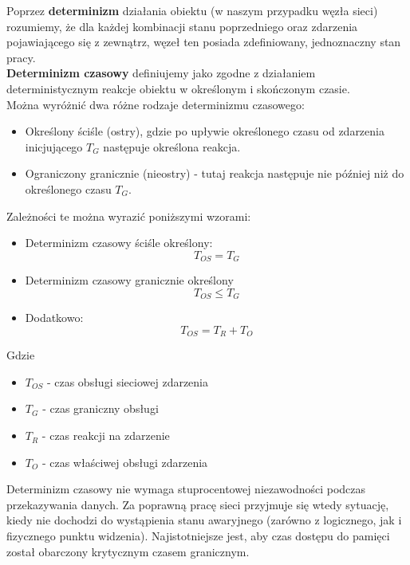 \documentclass[a4paper,twoside]{article}
\begin{document}
Poprzez \textbf{determinizm} działania obiektu (w naszym przypadku węzła sieci) rozumiemy, że dla każdej kombinacji stanu poprzedniego oraz zdarzenia pojawiającego się z zewnątrz, węzeł ten posiada zdefiniowany, jednoznaczny stan pracy. \\
\textbf{Determinizm czasowy} definiujemy jako zgodne z działaniem deterministycznym reakcje obiektu w określonym i skończonym czasie. \\
Można wyróżnić dwa różne rodzaje determinizmu czasowego:
\begin{itemize}
	\item Określony ściśle (ostry), gdzie po upływie określonego czasu od zdarzenia inicjującego $ T_G $ następuje określona reakcja.
	\item Ograniczony granicznie (nieostry) - tutaj reakcja następuje nie później niż do określonego czasu $ T_G $.
\end{itemize}
Zależności te można wyrazić poniższymi wzorami:
\begin{itemize}
	\item Determinizm czasowy ściśle określony:
	\begin{equation}
	T_{OS} = T_G
	\end{equation}
	\item Determinizm czasowy granicznie określony
	\begin{equation}
	T_{OS} \leq T_G
	\end{equation}
	\item Dodatkowo:
	\begin{equation}
	T_{OS} = T_R + T_O
	\end{equation}
\end{itemize}
Gdzie
\begin{itemize}
	\item $ T_{OS} $ - czas obsługi sieciowej zdarzenia
	\item $ T_G $ - czas graniczny obsługi
	\item $ T_R $ - czas reakcji na zdarzenie
	\item $ T_O $ - czas właściwej obsługi zdarzenia
\end{itemize}
Determinizm czasowy nie wymaga stuprocentowej niezawodności podczas przekazywania danych. Za poprawną pracę sieci przyjmuje się wtedy sytuację, kiedy nie dochodzi do wystąpienia stanu awaryjnego (zarówno z logicznego, jak i fizycznego punktu widzenia). Najistotniejsze jest, aby czas dostępu do pamięci został obarczony krytycznym czasem granicznym.\\
\end{document}
